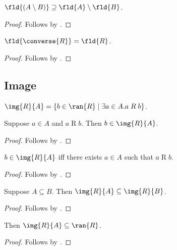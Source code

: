 \begin{proposition}\label{fld_setminus}
    $\fld{(A\setminus B)}\supseteq \fld{A}\setminus\fld{B}$.
\end{proposition}
\begin{proof}
    Follows by .
\end{proof}

\begin{proposition}\label{fld_converse}
    $\fld{\converse{R}} = \fld{R}$.
\end{proposition}
\begin{proof}
    Follows by .
\end{proof}


\subsection{Image}

\begin{definition}\label{img}
    $\img{R}{A} = \{b\in\ran{R} \mid \exists a\in A. a\mathrel{R} b \}$.
\end{definition}

\begin{proposition}\label{img_elem_intro}
    Suppose $a\in A$ and $a\mathrel{R} b$.
    Then $b\in\img{R}{A}$.
\end{proposition}
\begin{proof}
    Follows by .
\end{proof}

\begin{proposition}\label{img_iff}
    $b\in\img{R}{A}$ iff there exists $a\in A$ such that $a\mathrel{R} b$.
\end{proposition}
\begin{proof}
    Follows by .
\end{proof}

\begin{proposition}\label{img_subseteq}
    Suppose $A\subseteq B$.
    Then $\img{R}{A}\subseteq \img{R}{B}$.
\end{proposition}
\begin{proof}
    Follows by .
\end{proof}

\begin{proposition}\label{img_subseteq_ran}
    Then $\img{R}{A}\subseteq \ran{R}$.
\end{proposition}
\begin{proof}
    Follows by .
\end{proof}

